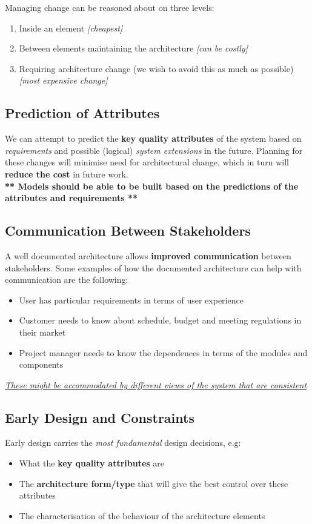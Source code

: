 \documentclass[a4paper]{article}
\begin{document}
Managing change can be reasoned about on three levels:
\begin{enumerate}
\item Inside an element \textit{[cheapest]}
\item Between elements maintaining the architecture \textit{[can be costly]}
\item Requiring architecture change (we wish to avoid this as much as possible) \textit{[most expensive change]}
\end{enumerate}

\subsection{Prediction of Attributes}
We can attempt to predict the \textbf{key quality attributes} of the system based on \textit{requirements} and possible (logical) \textit{system extensions} in the future. Planning for these changes will minimise need for architectural change, which in turn will \textbf{reduce the cost} in future work.\\

\textbf{** Models should be able to be built based on the predictions of the attributes and requirements **}


\subsection{Communication Between Stakeholders}
A well documented architecture allows \textbf{improved communication} between stakeholders. Some examples of how the documented architecture can help with communication are the following:
\begin{itemize}
\item User has particular requirements in terms of user experience
\item Customer needs to know about schedule, budget and meeting regulations in their market
\item Project manager needs to know the dependences in terms of the modules and components
\end{itemize}
\underline{\textit{These might be accommodated by different views of the system that are consistent}}

\subsection{Early Design and Constraints}
Early design carries the \textit{most fundamental} design decisions, e.g:
\begin{itemize}
\item What the \textbf{key quality attributes} are
\item The \textbf{architecture form/type} that will give the best control over these attributes
\item The characterisation of the behaviour of the architecture elements\\
\end{itemize}
\end{document}
